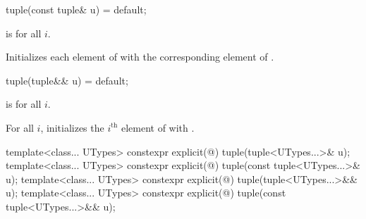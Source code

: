 \documentclass{wg21}
\begin{document}
%
\begin{itemdecl}
    tuple(const tuple& u) = default;
\end{itemdecl}

\begin{itemdescr}
    \pnum
    \mandates
     is  for all $i$.
    
    \pnum
    \effects
    Initializes each element of  with the
    corresponding element of .
\end{itemdescr}

%
\begin{itemdecl}
    tuple(tuple&& u) = default;
\end{itemdecl}

\begin{itemdescr}
    \pnum
    \constraints
     is  for all $i$.
    
    \pnum
    \effects
    For all $i$, initializes the $i^\text{th}$ element of  with
    .
\end{itemdescr}

%
\begin{itemdecl}
    template<class... UTypes> constexpr explicit(@\seebelow@) tuple(tuple<UTypes...>& u);
    template<class... UTypes> constexpr explicit(@\seebelow@) tuple(const tuple<UTypes...>& u);
    template<class... UTypes> constexpr explicit(@\seebelow@) tuple(tuple<UTypes...>&& u);
    template<class... UTypes> constexpr explicit(@\seebelow@) tuple(const tuple<UTypes...>&& u);
\end{itemdecl}
\end{document}
